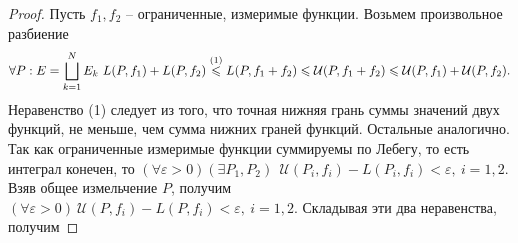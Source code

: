 \begin{proof}
 Пусть $f_1, f_2$ -- ограниченные, измеримые функции. Возьмем произвольное разбиение
 \begin{equation}
 	\forall P:E=\bigsqcup\limits_{k=1}^N E_k\ L(P,f_1)+L(P,f_2)\overset{(1)}{\leqslant} L(P, f_1+f_2) \leqslant \mathcal{U}(P, f_1+f_2) \? \leqslant \mathcal{U}(P, f_1)+\mathcal{U}(P, f_2). 
\end{equation}
Неравенство (1) следует из того, что точная нижняя грань суммы значений двух функций, не меньше, чем сумма нижних граней функций. Остальные аналогично. Так как ограниченные измеримые функции суммируемы по Лебегу, то есть интеграл конечен, то $(\forall \varepsilon >0)(\exists P_1, P_2)\ \ \mathcal{U}(P_i, f_i)-L(P_i, f_i)<\varepsilon,\ i = 1,2.$ Взяв общее измельчение $P$, получим $(\forall \varepsilon >0)\ \mathcal{U}(P, f_i)-L(P, f_i)<\varepsilon,\ i = 1,2.$ Складывая эти два неравенства, получим 

\end{proof}

 


































